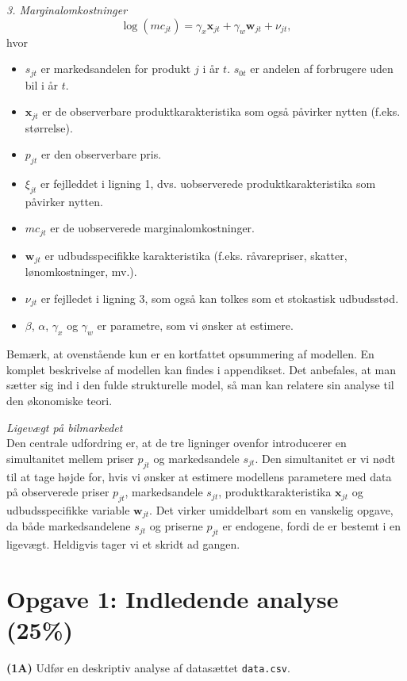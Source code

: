\documentclass[a4paper,12pt]{article}
\begin{document}
\noindent \emph{3. Marginalomkostninger}
\begin{equation}
    \log(mc_{jt}) = \gamma_x \mathbf{x}_{jt} + \gamma_w \mathbf{w}_{jt} + \nu_{jt}, \label{eq:mc}    
\end{equation}
hvor
\begin{itemize}
\itemsep-.5em 
    \item $s_{jt}$ er markedsandelen for produkt $j$ i år $t$. $s_{0t}$ er andelen af forbrugere uden bil i år $t$.
    \item  $\mathbf{x}_{jt}$ er de observerbare produktkarakteristika som også påvirker nytten (f.eks. størrelse).
    \item $p_{jt}$ er den observerbare pris.
    \item  $\xi_{jt}$ er fejlleddet i ligning 1, dvs. uobserverede produktkarakteristika som påvirker nytten.
    \item $mc_{jt}$ er de uobserverede marginalomkostninger.
    \item $\mathbf{w}_{jt}$ er udbudsspecifikke karakteristika (f.eks. råvarepriser, skatter, lønomkostninger, mv.).
    \item $\nu_{jt}$ er fejlledet i ligning 3, som også kan tolkes som
    et stokastisk udbudsstød.
    \item $\beta$, $\alpha$, $\gamma_x$ og $\gamma_w$ er parametre, som vi ønsker at estimere.
\end{itemize}
Bemærk, at ovenstående kun er en kortfattet opsummering af modellen. En komplet beskrivelse af modellen kan findes i appendikset. Det anbefales, at man sætter sig ind i den fulde strukturelle model, så man kan relatere sin analyse til den økonomiske teori.

\vspace{2em}

\noindent\emph{Ligevægt på bilmarkedet}\\
Den centrale udfordring er, at de tre ligninger ovenfor introducerer en simultanitet mellem priser $p_{jt}$ og markedsandele $s_{jt}$. Den simultanitet er vi nødt til at tage højde for, hvis vi ønsker at estimere modellens parametere med data på observerede priser $p_{jt}$, markedsandele $s_{jt}$, produktkarakteristika $\mathbf{x}_{jt}$ og udbudsspecifikke variable $\mathbf{w}_{jt}$. Det virker umiddelbart som en vanskelig opgave, da både markedsandelene $s_{jt}$ og priserne $p_{jt}$ er endogene, fordi de er bestemt i en ligevægt.  Heldigvis tager vi et skridt ad gangen. 

\break
\section*{Opgave 1: Indledende analyse (25\%) }
\noindent \textbf{(1A)} Udfør en deskriptiv analyse af datasættet \texttt{data.csv}. 
\end{document}
